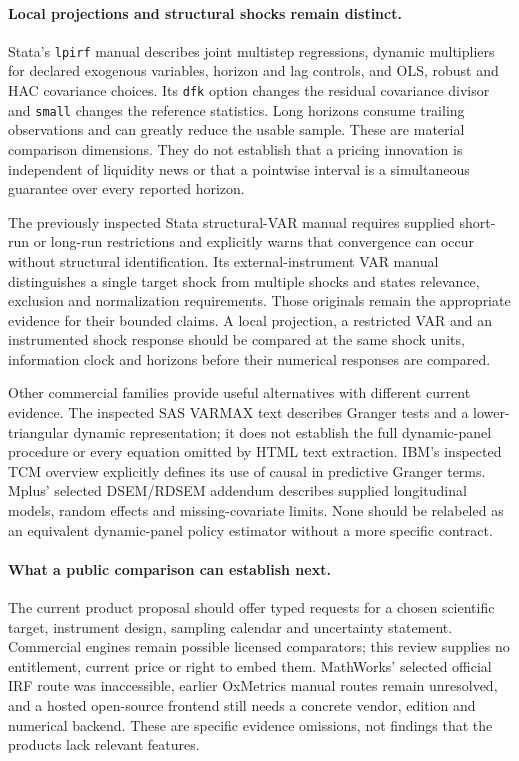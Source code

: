 \paragraph{Local projections and structural shocks remain distinct.}
Stata's \texttt{lpirf} manual describes joint multistep regressions, dynamic
multipliers for declared exogenous variables, horizon and lag controls, and
OLS, robust and HAC covariance choices. Its \texttt{dfk} option changes
the residual covariance divisor and \texttt{small} changes the reference
statistics. Long horizons consume trailing observations and can greatly
reduce the usable sample. These are material comparison dimensions. They
do not establish that a pricing innovation is independent of liquidity news
or that a pointwise interval is a simultaneous guarantee over every reported
horizon.~\citep{exec19_dynamic_stata_lp}

The previously inspected Stata structural-VAR manual requires supplied
short-run or long-run restrictions and explicitly warns that convergence
can occur without structural identification. Its external-instrument VAR
manual distinguishes a single target shock from multiple shocks and states
relevance, exclusion and normalization requirements. Those originals remain
the appropriate evidence for their bounded claims. A local projection, a
restricted VAR and an instrumented shock response should be compared at the
same shock units, information clock and horizons before their numerical
responses are compared.~\citep{exec13_ct_stata_svar,exec13_ct_stata_ivsvar}

Other commercial families provide useful alternatives with different current
evidence. The inspected SAS VARMAX text describes Granger tests and a
lower-triangular dynamic representation; it does not establish the full
dynamic-panel procedure or every equation omitted by HTML text extraction.
IBM's inspected TCM overview explicitly defines its use of causal in
predictive Granger terms. Mplus' selected DSEM/RDSEM addendum describes
supplied longitudinal models, random effects and missing-covariate limits.
None should be relabeled as an equivalent dynamic-panel policy estimator
without a more specific contract.~\citep{exec13_ct_sas_causal,
exec13_ct_sas_structural,exec13_ct_ibm_tcm,exec13_ct_mplus81}

\paragraph{What a public comparison can establish next.}
The current product proposal should offer typed requests for a chosen
scientific target, instrument design, sampling calendar and uncertainty
statement. Commercial engines remain possible licensed comparators; this
review supplies no entitlement, current price or right to embed them.
MathWorks' selected official IRF route was inaccessible, earlier OxMetrics
manual routes remain unresolved, and a hosted open-source frontend still
needs a concrete vendor, edition and numerical backend. These are specific
evidence omissions, not findings that the products lack relevant features.

